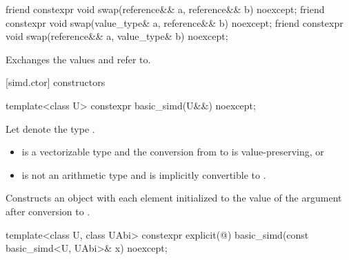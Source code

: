 \begin{itemdecl}
friend constexpr void swap(reference&& a, reference&& b) noexcept;
friend constexpr void swap(value_type& a, reference&& b) noexcept;
friend constexpr void swap(reference&& a, value_type& b) noexcept;
\end{itemdecl}

\begin{itemdescr}
  \pnum\effects
  Exchanges the values  and  refer to.
\end{itemdescr}

[simd.ctor]{ constructors}

\begin{itemdecl}
template<class U> constexpr basic_simd(U&&) noexcept;
\end{itemdecl}

\begin{itemdescr}
  \pnum Let  denote the type .

  \pnum\constraints
  \begin{itemize}
    \item {} is a vectorizable type and the conversion from
       to  is value-preserving, or

    \item {} is not an arithmetic type and is implicitly convertible
      to .
  \end{itemize}

  \pnum\effects
  Constructs an object with each element initialized to the value of the argument after conversion to .
\end{itemdescr}

\begin{itemdecl}
template<class U, class UAbi> constexpr explicit(@\seebelow@) basic_simd(const basic_simd<U, UAbi>& x) noexcept;
\end{itemdecl}

